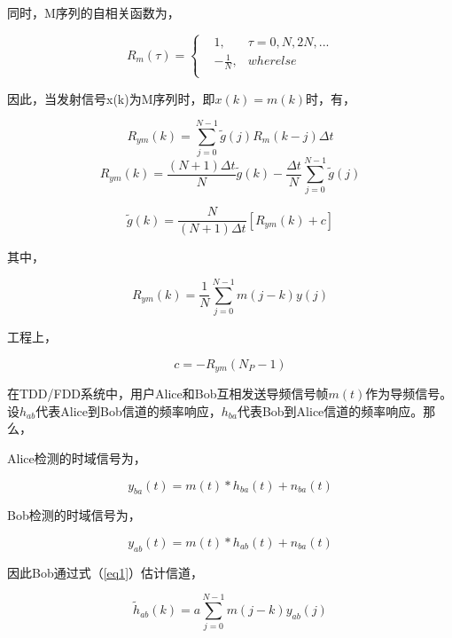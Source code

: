 \documentclass[master]{seuthesis} %
\begin{document}
\begin{Main}
同时，M序列的自相关函数为，

\begin{equation} \label{m_self}
    R_m(\tau) = \left\{
  \begin{aligned}
  &1, &\tau = 0, N, 2N, ... \\
  &-\frac{1}{N}, &wherelse \\
  \end{aligned}
  \right.
\end{equation}

因此，当发射信号x(k)为M序列时，即$x(k) = m(k)$时，有，

\begin{equation}
    R_{ym}(k) = \sum_{j=0}^{N-1} \tilde{g}(j)R_m(k-j)\Delta t
\end{equation}
\begin{equation}
    R_{ym}(k) = \frac{(N+1)\Delta t}{N} \tilde{g}(k) - \frac{\Delta t}{N} \sum_{j=0}^{N-1} \tilde{g}(j)
\end{equation}
  
\begin{equation}\label{eq1}
    \tilde{g}(k) = \frac{N}{(N+1)\Delta t} [R_{ym}(k) + c]
\end{equation}

其中，

\begin{equation}
  R_{ym}(k) = \frac{1}{N}\sum_{j=0}^{N-1}m(j-k)y(j)
\end{equation}

工程上，

\begin{equation}
  c=-R_{ym}(N_P - 1)
\end{equation}
  
在TDD/FDD系统中，用户Alice和Bob互相发送导频信号帧$m(t)$作为导频信号。设$h_{ab}$代表Alice到Bob信道的频率响应，$h_{ba}$代表Bob到Alice信道的频率响应。那么，

Alice检测的时域信号为，

\begin{equation}
    y_{ba}(t) = m(t) * h_{ba}(t) + n_{ba}(t) 
\end{equation}

Bob检测的时域信号为，

\begin{equation}
    y_{ab}(t) = m(t) * h_{ab}(t) + n_{ba}(t)    
\end{equation}

因此Bob通过式（\ref{eq1}）估计信道，

\begin{equation}
    \tilde{h}_{ab}(k) = a\sum_{j=0}^{N-1}m(j-k)y_{ab}(j)
\end{equation}
  

\end{Main}
\end{document}
